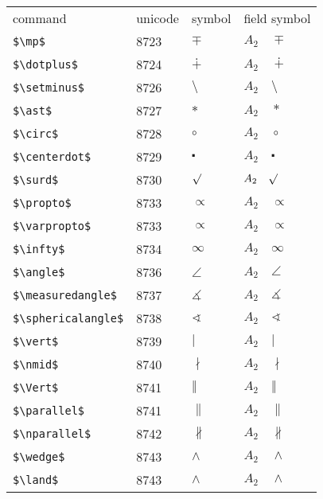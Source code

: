 \documentclass{article}
\begin{document}
\begin{table}
\begin{center}
\begin{tabular}{llll}
 command                  & unicode & symbol            & field symbol\\
 \verb#$\mp$#             & 8723    & $\mp$             & $A_2\quad \mp$\\
 \verb#$\dotplus$#        & 8724    & $\dotplus$        & $A_2\quad \dotplus$\\
 \verb#$\setminus$#       & 8726    & $\setminus$       & $A_2\quad \setminus$\\
 \verb#$\ast$#            & 8727    & $\ast$            & $A_2\quad \ast$\\
 \verb#$\circ$#           & 8728    & $\circ$           & $A_2\quad \circ$\\
 \verb#$\centerdot$#      & 8729    & $\centerdot$      & $A_2\quad \centerdot$\\
 \verb#$\surd$#           & 8730    & $\surd$           & $A_2\quad \surd$\\
 \verb#$\propto$#         & 8733    & $\propto$         & $A_2\quad \propto$\\
 \verb#$\varpropto$#      & 8733    & $\varpropto$      & $A_2\quad \varpropto$\\
 \verb#$\infty$#          & 8734    & $\infty$          & $A_2\quad \infty$\\
 \verb#$\angle$#          & 8736    & $\angle$          & $A_2\quad \angle$\\
 \verb#$\measuredangle$#  & 8737    & $\measuredangle$  & $A_2\quad \measuredangle$\\
 \verb#$\sphericalangle$# & 8738    & $\sphericalangle$ & $A_2\quad \sphericalangle$\\
 \verb#$\vert$#           & 8739    & $\vert$           & $A_2\quad \vert$\\
 \verb#$\nmid$#           & 8740    & $\nmid$           & $A_2\quad \nmid$\\
 \verb#$\Vert$#           & 8741    & $\Vert$           & $A_2\quad \Vert$\\
 \verb#$\parallel$#       & 8741    & $\parallel$       & $A_2\quad \parallel$\\
 \verb#$\nparallel$#      & 8742    & $\nparallel$      & $A_2\quad \nparallel$\\
 \verb#$\wedge$#          & 8743    & $\wedge$          & $A_2\quad \wedge$\\
 \verb#$\land$#           & 8743    & $\land$           & $A_2\quad \land$\\

\end{tabular}
\end{center}
\end{table}
\end{document}
